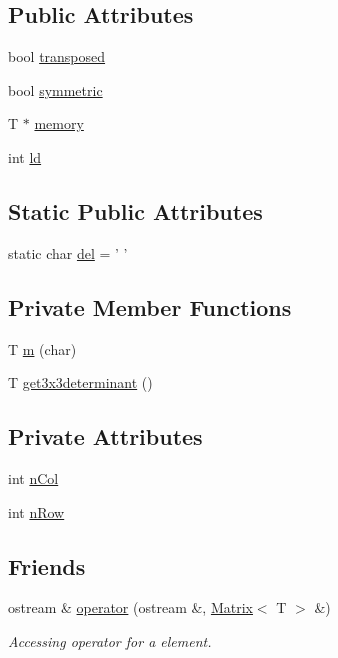 \subsection*{Public Attributes}
\begin{DoxyCompactItemize}
\item 
bool \hyperlink{singletonMatrix_aa9511b2f62fafa982819c9d22b4fbefc}{transposed}
\item 
bool \hyperlink{singletonMatrix_af2bf28cc007514273c14f89975438701}{symmetric}
\item 
T $\ast$ \hyperlink{singletonMatrix_ae50290f97073a6d396def5da5b36d811}{memory}
\item 
int \hyperlink{singletonMatrix_ac0297673d046ad5f9eaa4d621a95d6c8}{ld}
\end{DoxyCompactItemize}
\subsection*{Static Public Attributes}
\begin{DoxyCompactItemize}
\item 
static char \hyperlink{singletonMatrix_a97c4971ed81b3fe5aa55c05cd5ec7a4b}{del} = ' '
\end{DoxyCompactItemize}
\subsection*{Private Member Functions}
\begin{DoxyCompactItemize}
\item 
T \hyperlink{singletonMatrix_a9074cd1c4e1d995ba8267667868ac753}{m} (char)
\item 
T \hyperlink{singletonMatrix_ae6b5e83d3161ce069b86717c90ed0ea5}{get3x3determinant} ()
\end{DoxyCompactItemize}
\subsection*{Private Attributes}
\begin{DoxyCompactItemize}
\item 
int \hyperlink{singletonMatrix_aa3b73b40cb492b1a2b73c94fc5c3e212}{n\+Col}
\item 
int \hyperlink{singletonMatrix_a18ad6163c76247e0c007c48d18e62afa}{n\+Row}
\end{DoxyCompactItemize}
\subsection*{Friends}
\begin{DoxyCompactItemize}
\item 
ostream \& \hyperlink{singletonMatrix_abbea375d42e57221a552685b6bb1372f}{operator} (ostream \&, \hyperlink{singletonMatrix}{Matrix}$<$ T $>$ \&)
\begin{DoxyCompactList}\small\item\em Accessing operator for a element. \end{DoxyCompactList}\end{DoxyCompactItemize}


